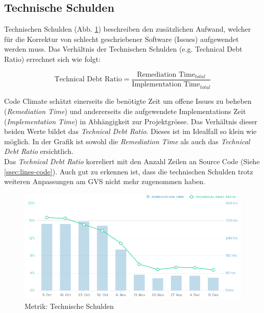 \documentclass[11pt,a4paper,english,oneside]{book}
\numberwithin{equation}{chapter}
\begin{document}
	\subsection{Technische Schulden}
	Technischen Schulden (Abb. \ref{fig:metric-technical-debt}) beschreiben den zusätzlichen Aufwand, welcher für die Korrektur von schlecht geschriebener Software (Issues) aufgewendet werden muss. Das Verhältnis der Technischen Schulden (e.g. Technical Debt Ratio) errechnet sich wie folgt: 
	
	\begin{equation*}
		\text{Technical Debt Ratio} = \frac{\text{Remediation Time}_{total}}{\text{Implementation Time}_{total}}
	\end{equation*}
	
	\noindent
	Code Climate schätzt einerseits die benötigte Zeit um offene Issues zu beheben (\textit{Remediation Time}) und andererseits die aufgewendete Implementations Zeit (\textit{Implementation Time}) in Abhängigkeit zur Projektgrösse. Das Verhältnis dieser beiden Werte bildet das \textit{Technical Debt Ratio}. Dieses ist im Idealfall so klein wie möglich. In der Grafik ist sowohl die \textit{Remediation Time} als auch das \textit{Technical Debt Ratio} ersichtlich. \\
	
	\noindent
	Das \textit{Technical Debt Ratio} korreliert mit den Anzahl Zeilen an Source Code (Siehe \ref{ssec:lines-code}). Auch gut zu erkennen ist, dass die technischen Schulden trotz weiteren Anpassungen am GVS nicht mehr zugenommen haben.

	\begin{figure}[h!]
		\centering
		\includegraphics[width=0.9\linewidth]{assets/images/metrics/technical_debt}
		\caption{Metrik: Technische Schulden}
		\label{fig:metric-technical-debt}
	\end{figure}
	
\end{document}
